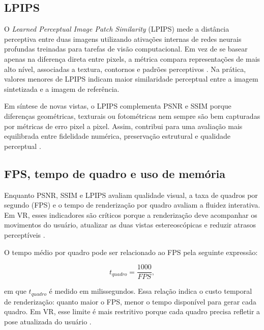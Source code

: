 \subsection{LPIPS}

O \textit{Learned Perceptual Image Patch Similarity} (LPIPS) mede a distância perceptiva entre duas imagens utilizando ativações internas de redes neurais profundas treinadas para tarefas de visão computacional. Em vez de se basear apenas na diferença direta entre pixels, a métrica compara representações de mais alto nível, associadas a textura, contornos e padrões perceptivos \cite{zhang2018}. Na prática, valores menores de LPIPS indicam maior similaridade perceptual entre a imagem sintetizada e a imagem de referência.

Em síntese de novas vistas, o LPIPS complementa PSNR e SSIM porque diferenças geométricas, texturais ou fotométricas nem sempre são bem capturadas por métricas de erro pixel a pixel. Assim, contribui para uma avaliação mais equilibrada entre fidelidade numérica, preservação estrutural e qualidade perceptual \cite{mildenhall2020,kerbl2023,zhang2018,fei2025survey3dgs}.

\subsection{FPS, tempo de quadro e uso de memória}

Enquanto PSNR, SSIM e LPIPS avaliam qualidade visual, a taxa de quadros por segundo (FPS) e o tempo de renderização por quadro avaliam a fluidez interativa. Em VR, esses indicadores são críticos porque a renderização deve acompanhar os movimentos do usuário, atualizar as duas vistas estereoscópicas e reduzir atrasos perceptíveis \cite{xu2023,tu2025,metaquest3s2024}.

O tempo médio por quadro pode ser relacionado ao FPS pela seguinte expressão:

\begin{equation}
t_{quadro} = \frac{1000}{FPS},
\label{eq:tempo_quadro}
\end{equation}

em que $t_{quadro}$ é medido em milissegundos. Essa relação indica o custo temporal de renderização: quanto maior o FPS, menor o tempo disponível para gerar cada quadro. Em VR, esse limite é mais restritivo porque cada quadro precisa refletir a pose atualizada do usuário \cite{xu2023,tu2025}.

